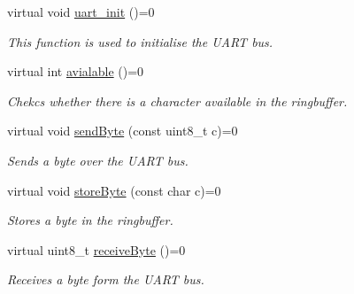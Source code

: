 \begin{DoxyCompactItemize}
\item 
virtual void \hyperlink{classhwuart_1_1uart__abstract_aa9042efec08b2f9714b35b1bc864cc7b}{uart\+\_\+init} ()=0
\begin{DoxyCompactList}\small\item\em This function is used to initialise the U\+A\+RT bus. \end{DoxyCompactList}\item 
\mbox{\label{classhwuart_1_1uart__abstract_a57b077a711ac56fbe45e1423bc0a0307}} 
virtual int \hyperlink{classhwuart_1_1uart__abstract_a57b077a711ac56fbe45e1423bc0a0307}{avialable} ()=0
\begin{DoxyCompactList}\small\item\em Chekcs whether there is a character available in the ringbuffer. \end{DoxyCompactList}\item 
\mbox{\label{classhwuart_1_1uart__abstract_a30285c660eaa4d29195b5cd3a9c9a3ca}} 
virtual void \hyperlink{classhwuart_1_1uart__abstract_a30285c660eaa4d29195b5cd3a9c9a3ca}{send\+Byte} (const uint8\+\_\+t c)=0
\begin{DoxyCompactList}\small\item\em Sends a byte over the U\+A\+RT bus. \end{DoxyCompactList}\item 
\mbox{\label{classhwuart_1_1uart__abstract_a2446c50f7dc6d8d55848a9d50a75dd71}} 
virtual void \hyperlink{classhwuart_1_1uart__abstract_a2446c50f7dc6d8d55848a9d50a75dd71}{store\+Byte} (const char c)=0
\begin{DoxyCompactList}\small\item\em Stores a byte in the ringbuffer. \end{DoxyCompactList}\item 
\mbox{\label{classhwuart_1_1uart__abstract_a767bcb070ba899f8c779de962268c5e2}} 
virtual uint8\+\_\+t \hyperlink{classhwuart_1_1uart__abstract_a767bcb070ba899f8c779de962268c5e2}{receive\+Byte} ()=0
\begin{DoxyCompactList}\small\item\em Receives a byte form the U\+A\+RT bus. \end{DoxyCompactList}\item 

\end{DoxyCompactItemize}
